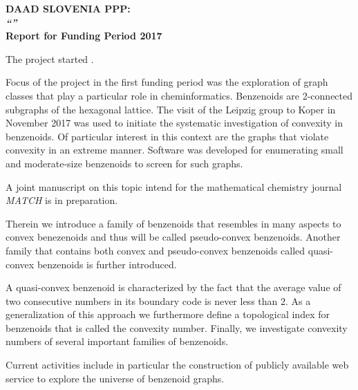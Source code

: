 \documentclass{article}
\begin{document}
 

\par\noindent\textbf{\large DAAD SLOVENIA PPP:\\[1em]
  \emph{``''}\\[1.0em]
  Report for Funding Period 2017}

The project started . 

Focus of the project in the first funding period was the exploration of
graph classes that play a particular role in cheminformatics. Benzenoids
are 2-connected subgraphs of the hexagonal lattice. The visit of the
Leipzig group to Koper in November 2017 was used to initiate the systematic
investigation of convexity in benzenoids. Of particular interest in this
context are the graphs that violate convexity in an extreme manner. Software
was developed for enumerating small and moderate-size benzenoids to screen
for such graphs. 


A joint manuscript on this topic intend for the mathematical chemistry
journal \emph{MATCH} is in preparation.

Therein we introduce a family of benzenoids that
resembles in many aspects to convex benezenoids and thus will be called pseudo-convex
benzenoids. Another family that contains both convex and pseudo-convex benzenoids called 
quasi-convex benzenoids is further introduced. 

A quasi-convex benzenoid is characterized by the fact that the average value of two consecutive 
numbers in its boundary code is never less than $2$. As a generalization of this approach we 
furthermore define a topological index for benzenoids that is called the convexity number. Finally, 
we investigate convexity numbers of several important families of benzenoids.

Current activities include in particular the construction of publicly
available web service to explore the universe of benzenoid graphs. 
\end{document}
